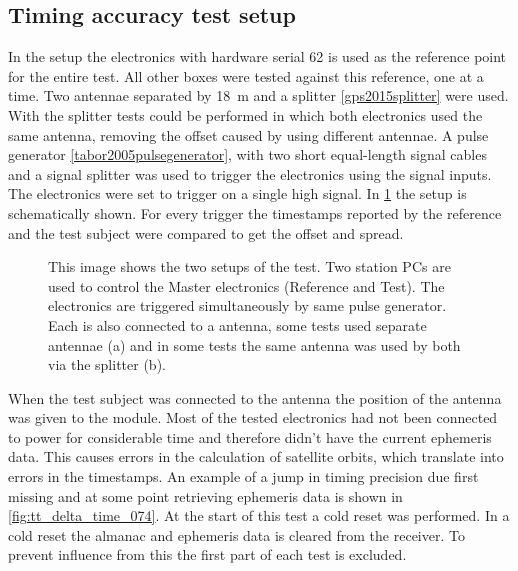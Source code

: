 \subsection{Timing accuracy test setup}
\label{sub:gps_test_setup}

In the setup the \hisparc electronics with hardware serial 62 is used as the reference point for the entire test. All other \hisparc boxes were tested against this reference, one at a time. Two \gps antennae separated by \SI{18}{\meter} and a \gps splitter \ref{gps2015splitter} were used. With the splitter tests could be performed in which both \hisparc electronics used the same \gps antenna, removing the offset caused by using different \gps antennae. A pulse generator \ref{tabor2005pulsegenerator}, with two short equal-length signal cables and a signal splitter was used to trigger the \hisparc electronics using the \pmt signal inputs. The electronics were set to trigger on a single high signal. In \cref{fig:setup} the setup is schematically shown. For every trigger the timestamps reported by the reference and the test subject were compared to get the offset and spread.

\begin{figure}
    \centering
    
    \caption{This image shows the two setups of the test. Two station PCs are used to control the \hisparc Master electronics (Reference and Test). The electronics are triggered simultaneously by same pulse generator. Each is also connected to a \gps antenna, some tests used separate \gps antennae (a) and in some tests the same \gps antenna was used by both via the splitter (b).}
    \label{fig:setup}
\end{figure}

When the test subject was connected to the \gps antenna the position of the antenna was given to the \gps module. Most of the tested electronics had not been connected to power for considerable time and therefore didn't have the current ephemeris data. This causes errors in the calculation of \gps satellite orbits, which translate into errors in the timestamps. An example of a jump in timing precision due first missing and at some point retrieving ephemeris data is shown in \cref{fig:tt_delta_time_074}. At the start of this test a cold reset was performed. In a cold reset the almanac and ephemeris data is cleared from the \gps receiver. To prevent influence from this the first part of each test is excluded.

